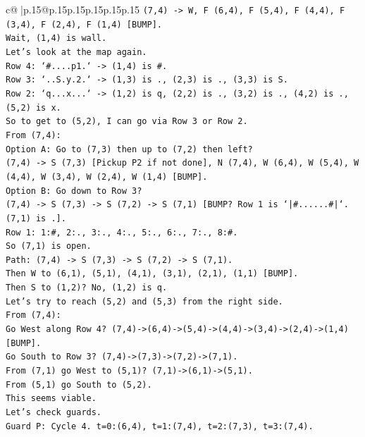 \documentclass{article}
\begin{document}
{\begin{supertabular}{c@{$\;$}|p{.15\linewidth}@{}p{.15\linewidth}p{.15\linewidth}p{.15\linewidth}p{.15\linewidth}p{.15\linewidth}}
{{{\texttt{(7,4) {-}> W, F (6,4), F (5,4), F (4,4), F (3,4), F (2,4), F (1,4) {[}BUMP{]}.} \\
\texttt{Wait, (1,4) is wall.} \\
\texttt{Let's look at the map again.} \\
\texttt{Row 4: `\#....p1.` {-}> (1,4) is \#.} \\
\texttt{Row 3: `..S.y.2.` {-}> (1,3) is ., (2,3) is ., (3,3) is S.} \\
\texttt{Row 2: `q...x...` {-}> (1,2) is q, (2,2) is ., (3,2) is ., (4,2) is ., (5,2) is x.} \\
\texttt{So to get to (5,2), I can go via Row 3 or Row 2.} \\
\texttt{From (7,4):} \\
\texttt{Option A: Go to (7,3) then up to (7,2) then left?} \\
\texttt{(7,4) {-}> S (7,3) {[}Pickup P2 if not done{]}, N (7,4), W (6,4), W (5,4), W (4,4), W (3,4), W (2,4), W (1,4) {[}BUMP{]}.} \\
\texttt{Option B: Go down to Row 3?} \\
\texttt{(7,4) {-}> S (7,3) {-}> S (7,2) {-}> S (7,1) {[}BUMP? Row 1 is `|\#......\#|`. (7,1) is .{]}.} \\
\texttt{Row 1: 1:\#, 2:., 3:., 4:., 5:., 6:., 7:., 8:\#.} \\
\texttt{So (7,1) is open.} \\
\texttt{Path: (7,4) {-}> S (7,3) {-}> S (7,2) {-}> S (7,1).} \\
\texttt{Then W to (6,1), (5,1), (4,1), (3,1), (2,1), (1,1) {[}BUMP{]}.} \\
\texttt{Then S to (1,2)? No, (1,2) is q.} \\
\texttt{Let's try to reach (5,2) and (5,3) from the right side.} \\
\texttt{From (7,4):} \\
\texttt{Go West along Row 4? (7,4){-}>(6,4){-}>(5,4){-}>(4,4){-}>(3,4){-}>(2,4){-}>(1,4) {[}BUMP{]}.} \\
\texttt{Go South to Row 3? (7,4){-}>(7,3){-}>(7,2){-}>(7,1).} \\
\texttt{From (7,1) go West to (5,1)? (7,1){-}>(6,1){-}>(5,1).} \\
\texttt{From (5,1) go South to (5,2).} \\
\texttt{This seems viable.} \\
\texttt{Let's check guards.} \\
\texttt{Guard P: Cycle 4. t=0:(6,4), t=1:(7,4), t=2:(7,3), t=3:(7,4).} \\
}}}
\end{supertabular}}
\end{document}
